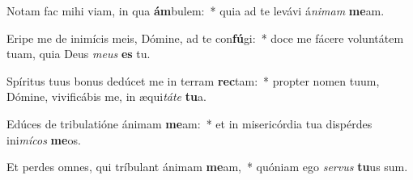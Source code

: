 \item Notam fac mihi viam, in qua \textbf{ám}bulem:~* quia ad te levávi á\textit{ni}\textit{mam} \textbf{me}am.
\item Eripe me de inimícis meis, Dómine, ad te con\textbf{fú}gi:~* doce me fácere voluntátem tuam, quia Deus \textit{me}\textit{us} \textbf{es} tu.
\item Spíritus tuus bonus dedúcet me in terram \textbf{rec}tam:~* propter nomen tuum, Dómine, vivificábis me, in æqui\textit{tá}\textit{te} \textbf{tu}a.
\item Edúces de tribulatióne ánimam \textbf{me}am:~* et in misericórdia tua dispérdes ini\textit{mí}\textit{cos} \textbf{me}os.
\item Et perdes omnes, qui tríbulant ánimam \textbf{me}am,~* quóniam ego \textit{ser}\textit{vus} \textbf{tu}us sum.
